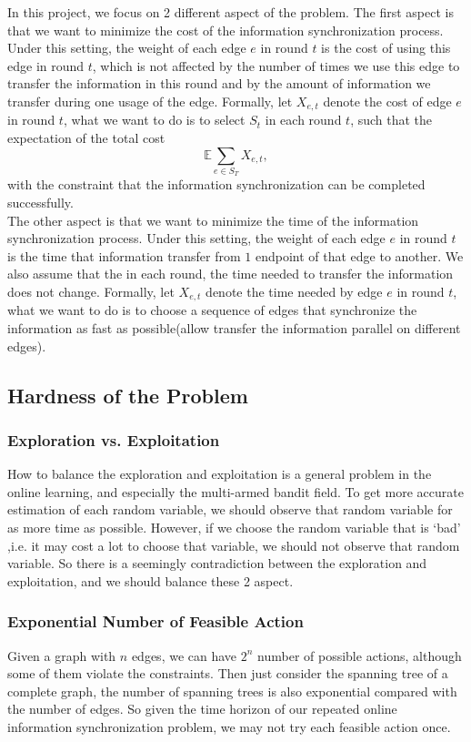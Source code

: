 \documentclass{article}
\theoremstyle{plain}
\theoremstyle{definition}
\theoremstyle{remark}
\begin{document}
    In this project, we focus on 2 different aspect of the problem. The first aspect is that we want to minimize the cost of the information synchronization process. Under this setting, the weight of each edge $e$ in round $t$ is the cost of using this edge in round $t$, which is not affected by the number of times we use this edge to transfer the information in this round and by the amount of information we transfer during one usage of the edge. Formally, let $X_{e,t}$ denote the cost of edge $e$ in round $t$, what we want to do is to select $S_t$ in each round $t$, such that the expectation of the total cost
    \[\mathbb E\sum_{e\in S_T}X_{e,t},\]
    with the constraint that the information synchronization can be completed successfully.\\

    The other aspect is that we want to minimize the time of the information synchronization process. Under this setting, the weight of each edge $e$ in round $t$ is the time that information transfer from $1$ endpoint of that edge to another. We also assume that the in each round, the time needed to transfer the information does not change. Formally, let $X_{e,t}$ denote the time needed by edge $e$ in round $t$, what we want to do is to choose a sequence of edges that synchronize the information as fast as possible(allow transfer the information parallel on different edges).

    \subsection{Hardness of the Problem}
    \subsubsection{Exploration vs. Exploitation}
    How to balance the exploration and exploitation is a general problem in the online learning, and especially the multi-armed bandit field. To get more accurate estimation of each random variable, we should observe that random variable for as more time as possible. However, if we choose the random variable that is `bad' ,i.e. it may cost a lot to choose that variable, we should not observe that random variable. So there is a seemingly contradiction between the exploration and exploitation, and we should balance these 2 aspect.

    \subsubsection{Exponential Number of Feasible Action}
    Given a graph with $n$ edges, we can have $2^n$ number of possible actions, although some of them violate the constraints. Then just consider the spanning tree of a complete graph, the number of spanning trees is also exponential compared with the number of edges. So given the time horizon of our repeated online information synchronization problem, we may not try each feasible action once.
\end{document}

